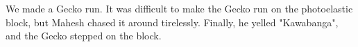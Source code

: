 We made a Gecko run. It was difficult to make the Gecko run on the photoelastic block, but Mahesh chased it around tirelessly. Finally, he yelled "Kawabanga", and the Gecko stepped on the block.
